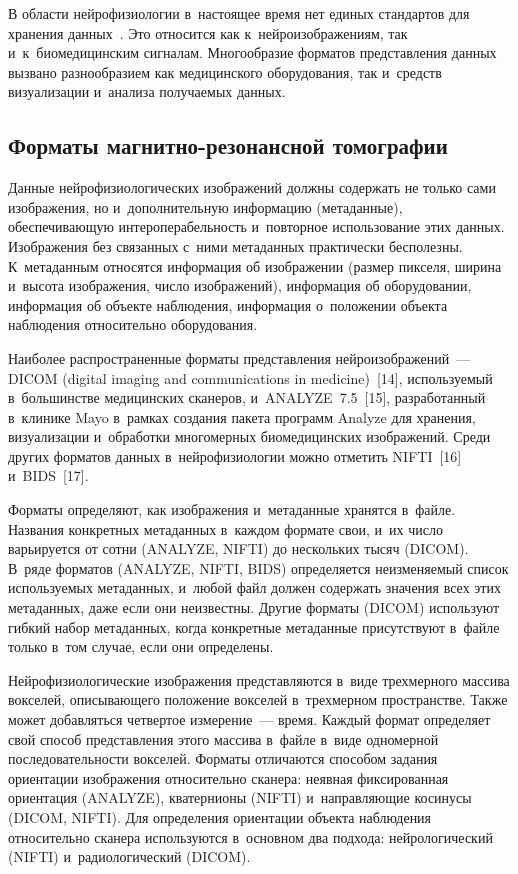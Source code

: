 \begin{multicols}{2}
    В области нейрофизиологии в~настоящее время нет единых стандартов 
для хранения данных~\cite{13-bs}. Это относится как к~нейроизображениям, 
так и~к~биомедицинским сигналам. Многообразие форматов представления 
данных вызвано разнообразием как медицинского оборудования, так 
и~средств визуализации и~анализа получаемых данных.

\vspace*{-4pt}
    
\subsection{Форматы магнитно-резонансной томографии}


    Данные нейрофизиологических изображений должны содержать не 
только сами изображения, но и~дополнительную информацию (метаданные), 
обеспечивающую интероперабельность и~повторное использование этих 
данных. Изображения без связанных с~ними метаданных практически 
бесполезны. К~метаданным относятся информация об изображении (размер 
пикселя, ширина и~высота изображения, число изображений), информация об 
оборудовании, информация об объекте наблюдения, информация 
о~положении объекта наблюдения относительно оборудования.
    
    Наиболее распространенные форматы пред\-став\-ле\-ния 
нейроизображений~--- DICOM
(digital imaging and communications in medicine)~[14], 
используемый в~большинстве 
медицинских сканеров, и~ANALYZE~7.5~[15], разработанный в~клинике 
Mayo в~рамках создания пакета программ Analyze для хранения, 
визуализации и~обработки многомерных биомедицинских изображений. 
Среди других форматов данных в~нейрофизиологии можно отметить 
NIFTI~[16] и~BIDS~[17].
    
    Форматы определяют, как изображения и~метаданные хранятся в~файле. 
Названия конкретных метаданных в~каждом формате свои, и~их число 
варь\-и\-ру\-ет\-ся от сотни (\mbox{ANALYZE}, NIFTI) до нескольких тысяч (DICOM). 
В~ряде форматов (\mbox{ANALYZE}, \mbox{NIFTI}, \mbox{BIDS}) определяется неизменяемый 
список используемых метаданных, и~любой файл должен содержать значения 
всех этих метаданных, даже если они неизвестны. Другие форматы (DICOM) 
используют гибкий набор метаданных, когда конкретные метаданные 
присутствуют в~файле только в~том случае, если они определены.
    
    Нейрофизиологические изображения пред\-ставля\-ются в~виде 
трехмерного массива вокселей, описывающего положение вокселей 
в~трехмерном пространстве. Также может добавляться четвертое 
измерение~--- время. Каждый формат определяет свой способ представления 
этого массива в~файле в~виде одномерной последовательности вокселей. 
Форматы отличаются способом задания ориентации изображения 
относительно сканера: неявная фиксированная ориентация (\mbox{ANALYZE}), 
кватернионы (NIFTI) и~направляющие косинусы (\mbox{DICOM}, NIFTI). Для 
определения ориентации объекта наблюдения относительно сканера 
используются в~основном два подхода: нейрологический (NIFTI) 
и~радиологический (DICOM).


\end{multicols}
